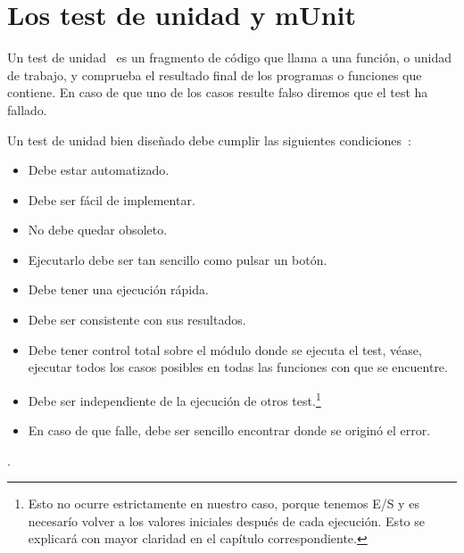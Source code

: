 

\section{Los test de unidad y mUnit}

Un test de unidad~\cite{unitTests} es un fragmento de código que llama a una función, o unidad de trabajo, y comprueba el resultado final de los programas o funciones que contiene. En caso de que uno de los casos resulte falso diremos que el test ha fallado.\par

Un test de unidad bien diseñado debe cumplir las siguientes condiciones~\cite{unitTests}: \par

\begin{itemize}
\item Debe estar automatizado.
\item Debe ser fácil de implementar.
\item No debe quedar obsoleto.
\item Ejecutarlo debe ser tan sencillo como pulsar un botón.
\item Debe tener una ejecución rápida.
\item Debe ser consistente con sus resultados. 
\item Debe tener control total sobre el módulo donde se ejecuta el test, véase, ejecutar todos los casos posibles en todas las funciones con que se encuentre.
\item Debe ser independiente de la ejecución de otros test.\footnote{Esto no ocurre estrictamente en nuestro caso, porque tenemos E/S y es necesarío volver a los valores iniciales después de cada ejecución. Esto se explicará con mayor claridad en el capítulo correspondiente.}
\item En caso de que falle, debe ser sencillo encontrar donde se originó el error.
\end{itemize}.

